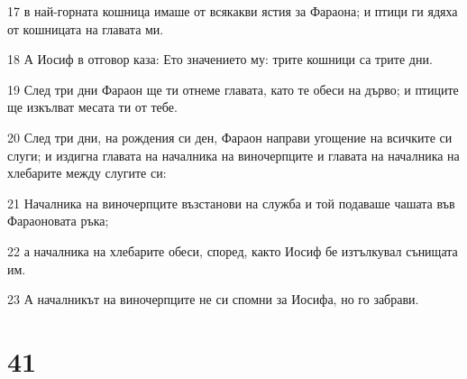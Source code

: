 \par 17 в най-горната кошница имаше от всякакви ястия за Фараона; и птици ги ядяха от кошницата на главата ми.
\par 18 А Иосиф в отговор каза: Ето значението му: трите кошници са трите дни.
\par 19 След три дни Фараон ще ти отнеме главата, като те обеси на дърво; и птиците ще изкълват месата ти от тебе.
\par 20 След три дни, на рождения си ден, Фараон направи угощение на всичките си слуги; и издигна главата на началника на виночерпците и главата на началника на хлебарите между слугите си:
\par 21 Началника на виночерпците възстанови на служба и той подаваше чашата във Фараоновата ръка;
\par 22 а началника на хлебарите обеси, според, както Иосиф бе изтълкувал сънищата им.
\par 23 А началникът на виночерпците не си спомни за Иосифа, но го забрави.

\chapter{41}

